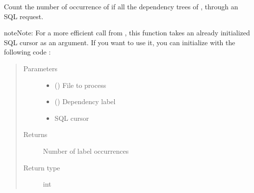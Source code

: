 \documentclass[letterpaper,10pt,english]{sphinxmanual}
\begin{document}

\begin{fulllineitems}
\label{\detokenize{analysis:loacore.analysis.frequencies.count_label}}
Count the number of occurrence of  if all the dependency trees of , through an SQL request.

\begin{sphinxadmonition}{note}{Note:}
For a more efficient call from {\hyperref[\detokenize{analysis:loacore.analysis.frequencies.label_frequencies}]{}}, this function takes an already initialized SQL
cursor as an argument.
If you want to use it, you can initialize  with the following code :

%
\begin{sphinxVerbatim}[commandchars=\\\{\}]
   
   
  
  
\end{sphinxVerbatim}
\end{sphinxadmonition}
\begin{quote}\begin{description}
\item[{Parameters}] \leavevmode\begin{itemize}
\item {} 
 ({\hyperref[\detokenize{classes:loacore.classes.classes.File}]{}}) \textendash{} File to process

\item {} 
 () \textendash{} Dependency label

\item {} 
 \textendash{} SQL cursor

\end{itemize}

\item[{Returns}] \leavevmode
Number of label occurrences

\item[{Return type}] \leavevmode
int

\end{description}\end{quote}

\end{fulllineitems}
\end{document}

